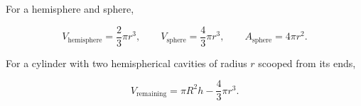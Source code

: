 \setcounter{enumii}{31}\setcounter{equation}{1}
For a hemisphere and sphere,


\begin{equation}
V_{\mathrm{hemisphere}}=\frac23\pi r^3,\qquad V_{\mathrm{sphere}}=\frac43\pi r^3,
\qquad A_{\mathrm{sphere}}=4\pi r^2.
\label{eq:sphere-formula}
\end{equation}

\setcounter{enumii}{31}\setcounter{equation}{2}
For a cylinder with two hemispherical cavities of radius $r$ scooped from its ends,



\begin{equation}
V_{\mathrm{remaining}}=\pi R^2h-\frac43\pi r^3.
\label{eq:scooped-cylinder}
\end{equation}

